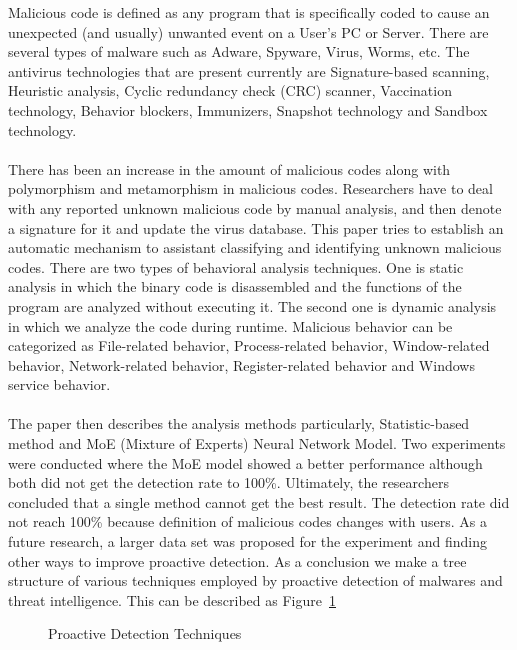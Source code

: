 \documentclass[11pt]{article}
\begin{document}
	Malicious code is defined as any program that is specifically coded to cause an unexpected (and usually) unwanted event on a User’s PC or Server. There are several types of malware such as Adware, Spyware, Virus, Worms, etc. The antivirus technologies that are present currently are Signature-based scanning,	Heuristic analysis, Cyclic redundancy check (CRC) scanner, Vaccination technology, Behavior blockers, Immunizers, Snapshot technology and Sandbox technology.\\ \\
	There has been an increase in the amount of malicious codes along with polymorphism and metamorphism in malicious codes. Researchers have to deal with any reported unknown malicious code by manual analysis, and then denote a signature for it and update the virus database. This paper tries to establish an automatic mechanism to assistant classifying and identifying unknown malicious codes. There are two types of behavioral analysis techniques. One is static analysis in which the binary code is disassembled and the functions of the program are analyzed without executing it. The second one is dynamic analysis in which we analyze the code during runtime. Malicious behavior can be categorized as File-related behavior, Process-related behavior, Window-related behavior, Network-related behavior, Register-related behavior and Windows service behavior.\\ \\
	The paper then describes the analysis methods particularly, Statistic-based method and MoE (Mixture of Experts) Neural Network Model. Two experiments were conducted where the MoE model showed a better performance although both did not get the detection rate to 100\%. Ultimately, the researchers concluded that a single method cannot get the best result.  The detection rate did not reach 100\% because definition of malicious codes changes with users. As a future research, a larger data set was proposed for the experiment and finding other ways to improve proactive detection.	
	As a conclusion we make a tree structure of various techniques employed by proactive detection of malwares and threat intelligence. This can be described as Figure~\ref{proactive}\\
	\begin{figure}
		\centering
		\caption{Proactive Detection Techniques}\label{proactive}
	\end{figure}
	
\end{document}
